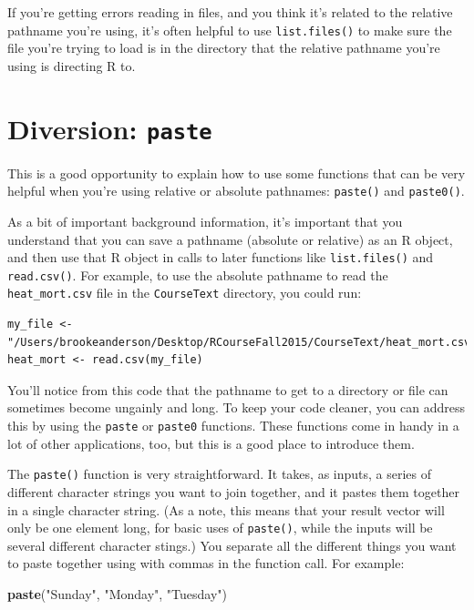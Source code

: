 \documentclass[]{book}
\makeatletter
\newenvironment{Shaded}{\begin{snugshade}}{\end{snugshade}}
\newcommand{\KeywordTok}[1]{\textcolor[rgb]{0.13,0.29,0.53}{\textbf{{#1}}}}
\newcommand{\StringTok}[1]{\textcolor[rgb]{0.31,0.60,0.02}{{#1}}}
\newcommand{\NormalTok}[1]{{#1}}
\newenvironment{kframe}{%
\medskip{}
\setlength{\fboxsep}{.8em}
 \def\at@end@of@kframe{}%
 \ifinner\ifhmode%
  \def\at@end@of@kframe{\end{minipage}}%
  \begin{minipage}{\columnwidth}%
 \fi\fi%
 \def\FrameCommand##1{\hskip\@totalleftmargin \hskip-\fboxsep
 \colorbox{shadecolor}{##1}\hskip-\fboxsep
     \hskip-\linewidth \hskip-\@totalleftmargin \hskip\columnwidth}%
 \MakeFramed {\advance\hsize-\width
   \@totalleftmargin\z@ \linewidth\hsize
   \@setminipage}}%
 {\par\unskip\endMakeFramed%
 \at@end@of@kframe}
\renewenvironment{Shaded}{\begin{kframe}}{\end{kframe}}
\makeatother
\begin{document}
If you're getting errors reading in files, and you think it's related to
the relative pathname you're using, it's often helpful to use
\texttt{list.files()} to make sure the file you're trying to load is in
the directory that the relative pathname you're using is directing R to.

\section{\texorpdfstring{Diversion:
\texttt{paste}}{Diversion: paste}}\label{diversion-paste}

This is a good opportunity to explain how to use some functions that can
be very helpful when you're using relative or absolute pathnames:
\texttt{paste()} and \texttt{paste0()}.

As a bit of important background information, it's important that you
understand that you can save a pathname (absolute or relative) as an R
object, and then use that R object in calls to later functions like
\texttt{list.files()} and \texttt{read.csv()}. For example, to use the
absolute pathname to read the \texttt{heat\_mort.csv} file in the
\texttt{CourseText} directory, you could run:

\begin{verbatim}
my_file <- "/Users/brookeanderson/Desktop/RCourseFall2015/CourseText/heat_mort.csv"
heat_mort <- read.csv(my_file)
\end{verbatim}

You'll notice from this code that the pathname to get to a directory or
file can sometimes become ungainly and long. To keep your code cleaner,
you can address this by using the \texttt{paste} or \texttt{paste0}
functions. These functions come in handy in a lot of other applications,
too, but this is a good place to introduce them.

The \texttt{paste()} function is very straightforward. It takes, as
inputs, a series of different character strings you want to join
together, and it pastes them together in a single character string. (As
a note, this means that your result vector will only be one element
long, for basic uses of \texttt{paste()}, while the inputs will be
several different character stings.) You separate all the different
things you want to paste together using with commas in the function
call. For example:

\begin{Shaded}
\begin{Highlighting}[]
\KeywordTok{paste}\NormalTok{(}\StringTok{"Sunday"}\NormalTok{, }\StringTok{"Monday"}\NormalTok{, }\StringTok{"Tuesday"}\NormalTok{)}
\end{Highlighting}
\end{Shaded}
\end{document}
